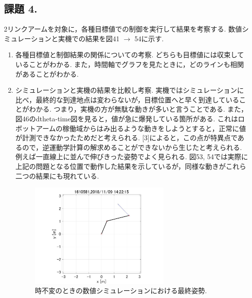 \documentclass[twocolumn, 10pt,a4j]{jsarticle}
\begin{document}
  \subsection{課題 4.}
    2リンクアームを対象に，各種目標値での制御を実行して結果を考察する. 数値シミュレーションと実機での結果を図41 $\to$ 54に示す.
    \begin{enumerate}
      \item 各種目標値と制御結果の関係についての考察.
        どちらも目標値には収束していることがわかる. また，時間軸でグラフを見たときに，どのラインも相関があることがわかる.

      \item シミュレーションと実機の結果を比較し考察.
        実機ではシミュレーションに比べ，最終的な到達地点は変わらないが，目標位置へと早く到達していることがわかる. つまり，実機の方が無駄な動きが多いと言うことである.
        また，図46のdtheta-time図を見ると，値が急に爆発している箇所がある. これはロボットアームの稼働域からはみ出るような動きをしようとすると，正常に値が計測できなかったためだと考えられる.
  [3]によると，この点が特異点であるので，逆運動学計算の解求めることができないから生じたと考えられる. 例えば一直線上に並んで伸びきった姿勢でよく見られる.
        図53, 54では実際に上記の問題となる位置で動作した結果を示しているが，同様な動きがこれら二つの結果にも現れている.

        \begin{figure}[H]
          \begin{center}
            \includegraphics[width=7cm]{../img/kadai45/jpg_hand_zifuhen_saisyu_sisei.jpg}
            \caption{時不変のときの数値シミュレーションにおける最終姿勢.}
          \end{center}
        \end{figure}
        

\end{enumerate}
\end{document}
